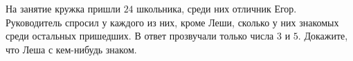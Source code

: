 На занятие кружка пришли $24$ школьника, среди них отличник Егор. Руководитель спросил у каждого из них, кроме Леши, сколько у них знакомых среди остальных пришедших. В ответ прозвучали только числа $3$ и $5$. Докажите, что Леша с кем-нибудь знаком.